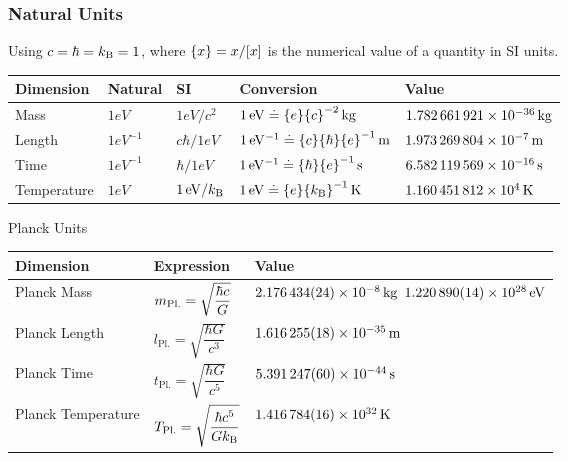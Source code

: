 		\subsubsection{Natural Units}
			Using $c=\hbar=k_{\text{B}}=1$, where $\qty{x}=x/\qty[x]$ is the numerical value of a quantity in SI units.
			\begin{center}
				\begin{tabular}{| L{.14\textwidth} L{.1\textwidth} L{.1\textwidth} L{.25\textwidth} L{.25\textwidth} |}
					\hline
					Dimension & Natural & SI & Conversion & Value \\ \hline \hline
					Mass & $1\unit{eV}$ & $1\unit{eV} / c^2$ & $1\,\mathrm{eV}\doteq \qty{e}\qty{c}^{-2}\,\mathrm{kg}$ & $1.782\,661\,921\times 10^{-36}\,\mathrm{kg}$ \\ \hline
					Length & $1\unit{eV^{-1}}$ & $c \hbar / 1 \unit{eV}$ & $1\,\mathrm{eV^{-1}}\doteq \qty{c}\qty{\hbar}\qty{e}^{-1}\,\mathrm{m}$ & $1.973\,269\,804\times 10^{-7}\,\mathrm{m}$ \\ \hline
					Time & $1\unit{eV^{-1}}$ & $\hbar / 1 \unit{eV}$ & $1\,\mathrm{eV^{-1}}\doteq \qty{\hbar}\qty{e}^{-1}\,\mathrm{s}$ & $6.582\,119\,569\times 10^{-16}\,\mathrm{s}$ \\ \hline
					Temperature & $1\unit{eV}$ & $1\,\mathrm{eV} / k_{\text{B}}$ & $1\,\mathrm{eV}\doteq \qty{e}\qty{k_{\text{B}}}^{-1}\,\mathrm{K}$ & $1.160\,451\,812\times 10^{4}\,\mathrm{K}$ \\ \hline
				\end{tabular}
			\end{center}

			\noindent
			Planck Units
			\begin{center}
				\begin{tabular}{| L{.25\textwidth} L{.2\textwidth} L{.25\textwidth} |}
					\hline
					Dimension & Expression & Value \\ \hline \hline
					Planck Mass & $m_{\text{Pl.}} = \sqrt{\dfrac{\hbar c}{G}}$ & $2.176\,434(24)\times 10^{-8}\,\mathrm{kg}$  $1.220\,890(14)\times 10^{28}\,\mathrm{eV}$  \\ \hline
					Planck Length & $l_{\text{Pl.}} = \sqrt{\dfrac{\hbar G}{c^3}}$ & $1.616\,255(18)\times 10^{-35}\,\mathrm{m}$ \\ \hline
					Planck Time & $t_{\text{Pl.}} = \sqrt{\dfrac{\hbar G}{c^5}}$ & $5.391\,247(60)\times 10^{-44}\,\mathrm{s}$ \\ \hline
					Planck Temperature & $T_{\text{Pl.}} = \sqrt{\dfrac{\hbar c^5}{G k_{\text{B}}}}$ & $1.416\,784(16)\times 10^{32}\,\mathrm{K}$ \\ \hline
				\end{tabular}
			\end{center}
